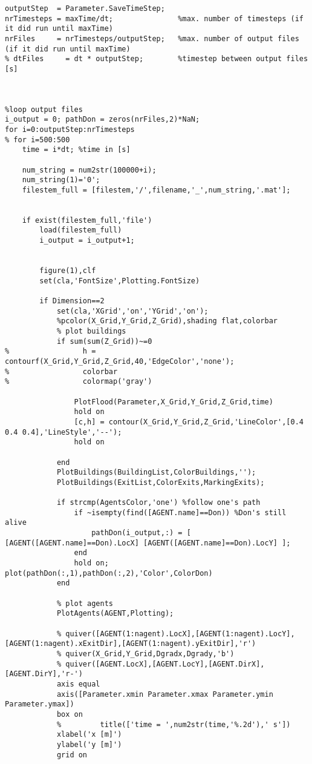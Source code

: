 \begin{lstlisting}[breaklines]
outputStep  = Parameter.SaveTimeStep;
nrTimesteps = maxTime/dt;               %max. number of timesteps (if it did run until maxTime)
nrFiles     = nrTimesteps/outputStep;   %max. number of output files (if it did run until maxTime)
% dtFiles     = dt * outputStep;        %timestep between output files [s]



%loop output files
i_output = 0; pathDon = zeros(nrFiles,2)*NaN;
for i=0:outputStep:nrTimesteps
% for i=500:500
    time = i*dt; %time in [s]
    
    num_string = num2str(100000+i);
    num_string(1)='0';
    filestem_full = [filestem,'/',filename,'_',num_string,'.mat'];
    
    
    if exist(filestem_full,'file')
        load(filestem_full)
        i_output = i_output+1;

        
        figure(1),clf
        set(cla,'FontSize',Plotting.FontSize)
        
        if Dimension==2
            set(cla,'XGrid','on','YGrid','on');
            %pcolor(X_Grid,Y_Grid,Z_Grid),shading flat,colorbar
            % plot buildings
            if sum(sum(Z_Grid))~=0
%                 h = contourf(X_Grid,Y_Grid,Z_Grid,40,'EdgeColor','none');
%                 colorbar
%                 colormap('gray')

                PlotFlood(Parameter,X_Grid,Y_Grid,Z_Grid,time)
                hold on
                [c,h] = contour(X_Grid,Y_Grid,Z_Grid,'LineColor',[0.4 0.4 0.4],'LineStyle','--');
                hold on
                
            end
            PlotBuildings(BuildingList,ColorBuildings,'');
            PlotBuildings(ExitList,ColorExits,MarkingExits);
            
            if strcmp(AgentsColor,'one') %follow one's path
                if ~isempty(find([AGENT.name]==Don)) %Don's still alive
                    pathDon(i_output,:) = [ [AGENT([AGENT.name]==Don).LocX] [AGENT([AGENT.name]==Don).LocY] ];
                end
                hold on; plot(pathDon(:,1),pathDon(:,2),'Color',ColorDon)
            end
            
            % plot agents
            PlotAgents(AGENT,Plotting);
            
            % quiver([AGENT(1:nagent).LocX],[AGENT(1:nagent).LocY],[AGENT(1:nagent).xExitDir],[AGENT(1:nagent).yExitDir],'r')
            % quiver(X_Grid,Y_Grid,Dgradx,Dgrady,'b')
            % quiver([AGENT.LocX],[AGENT.LocY],[AGENT.DirX],[AGENT.DirY],'r-')
            axis equal
            axis([Parameter.xmin Parameter.xmax Parameter.ymin Parameter.ymax])
            box on
            %         title(['time = ',num2str(time,'%.2d'),' s'])
            xlabel('x [m]')
            ylabel('y [m]')
            grid on
        

\end{lstlisting}
